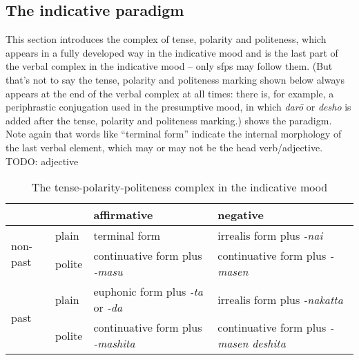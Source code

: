 \documentclass[UTF8, a4paper, oneside, scheme=plain]{ctexrep}
\newcommand{\corpus}[1]{\emph{#1}}
\begin{document}
\subsection{The indicative paradigm}\label{sec:indicative-paradigm}

This section introduces the complex of tense, polarity and politeness,
which appears in a fully developed way in the indicative mood
and is the last part of the verbal complex in the indicative mood
-- only \ac{sfp}s may follow them.
(But that's not to say the tense, polarity and politeness marking shown below
always appears at the end of the verbal complex at all times:
there is, for example, a periphrastic conjugation used in the presumptive mood, 
in which \corpus{dar\={o}} or \corpus{desho} is added after the tense, polarity and politeness marking.)
 shows the paradigm. 
Note again that words like ``terminal form'' indicate the internal morphology 
of the last verbal element, 
which may or may not be the head verb/adjective.
TODO: adjective

\begin{table}[H]
    \caption{The tense-polarity-politeness complex in the indicative mood}
    \label{tbl:tense-polarity-politeness}
    \begin{tabular}{llll}
        \toprule
        &                            & affirmative                                                       & negative                                                          \\
                              \midrule
    \multirow{2}{*}{non-past} & plain                      & terminal form                                                     & irrealis form plus \corpus{-nai}                                   \\
                              & polite                     & continuative form plus \corpus{-masu}                              & continuative form plus \corpus{-masen}                             \\ \midrule
    \multirow{2}{*}{past}     & \multicolumn{1}{l}{plain}  & \multicolumn{1}{l}{euphonic form plus \corpus{-ta} or \corpus{-da}} & \multicolumn{1}{l}{irrealis form plus \corpus{-nakatta}}           \\
                              & \multicolumn{1}{l}{polite} & \multicolumn{1}{l}{continuative form plus \corpus{-mashita}}       & \multicolumn{1}{l}{continuative form plus \corpus{-masen deshita}} \\
                              \bottomrule
    \end{tabular}
\end{table}
\end{document}

